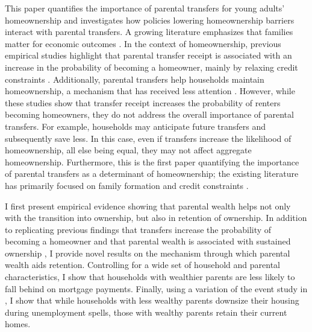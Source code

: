 \documentclass[12pt]{article}
\begin{document}
This paper quantifies the importance of parental transfers for young adults' homeownership and investigates how policies lowering homeownership barriers interact with parental transfers. A growing literature emphasizes that families matter for economic outcomes \citep{Doepke2016a}. In the context of homeownership, previous empirical studies highlight that parental transfer receipt is associated with an increase in the probability of becoming a homeowner, mainly by relaxing credit constraints \citep[see e.g.,][]{Lee2018,Blickle2019,wold2024housing}. Additionally, parental transfers help households maintain homeownership, a mechanism that has received less attention \citep[see e.g.,][]{bond2021role}. However, while these studies show that transfer receipt increases the probability of renters becoming homeowners, they do not address the overall importance of parental transfers. For example, households may anticipate future transfers and subsequently save less. In this case, even if transfers increase the likelihood of homeownership, all else being equal, they may not affect aggregate homeownership. Furthermore, this is the first paper quantifying the importance of parental transfers as a determinant of homeownership; the existing literature has primarily focused on family formation and credit constraints \citep[see e.g.,][]{Chang2024,Paz-Pardo2019,Mabille2020}.

I first present empirical evidence showing that parental wealth helps not only with the transition into ownership, but also in retention of ownership. In addition to replicating previous findings that transfers increase the probability of becoming a homeowner and that parental wealth is associated with sustained ownership \citep[see e.g.,][]{Lee2018,bond2021role}, I provide novel results on the mechanism through which parental wealth aids retention. Controlling for a wide set of household and parental characteristics, I show that households with wealthier parents are less likely to fall behind on mortgage payments. Finally, using a variation of the event study in \cite{Chetty2007}, I show that while households with less wealthy parents downsize their housing during unemployment spells, those with wealthy parents retain their current homes.
\end{document}
